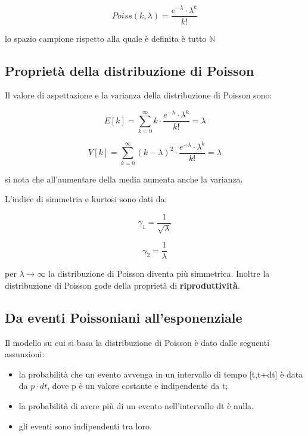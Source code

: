 \begin{equation}
	Poiss(k,\lambda) = \dfrac{e^{-\lambda} \cdot \lambda^k}{k!}
\end{equation}

lo spazio campione rispetto alla quale \`{e} definita \`{e} tutto $\mathbb{N}$



\subsection{Propriet\`{a} della distribuzione di Poisson}

Il valore di aspettazione e la varianza della distribuzione di Poisson sono:

\begin{equation}
	E[k] = \sum_{k=0}^{\infty}k \cdot \dfrac{e^{-\lambda} \cdot \lambda^k}{k!} = \lambda 
\end{equation}

\begin{equation}
	V[k] = \sum_{k=0}^{\infty} (k - \lambda)^2 \cdot \dfrac{e^{-\lambda} \cdot \lambda^k}{k!} = \lambda 
\end{equation}

si nota che all'aumentare della media aumenta anche la varianza. \newline

L'indice di simmetria e kurtosi sono dati da:

\begin{equation}
	\gamma_1 = \dfrac{1}{\sqrt{\lambda}}
\end{equation}

\begin{equation}
	\gamma_2 = \frac{1}{\lambda}
\end{equation}

per $\lambda \rightarrow \infty $ la distribuzione di Poisson diventa pi\`{u} simmetrica. Inoltre la distribuzione di Poisson gode della propriet\`{a} di \textbf{riproduttivit\`{a}}.


\subsection{Da eventi Poissoniani all'esponenziale}

Il modello su cui si basa la distribuzione di Poisson \`{e} dato dalle seguenti assunzioni:

\begin{itemize}
	\item la probabilit\`{a} che un evento avvenga in un intervallo di tempo [t,t+dt] \`{e} data da $p\cdot dt$, dove p \`{e} un valore costante e indipendente da t;
	\item la probabilit\`{a} di avere pi\`{u} di un evento nell'intervallo dt \`{e} nulla.
	\item gli eventi sono indipendenti tra loro.
\end{itemize}

